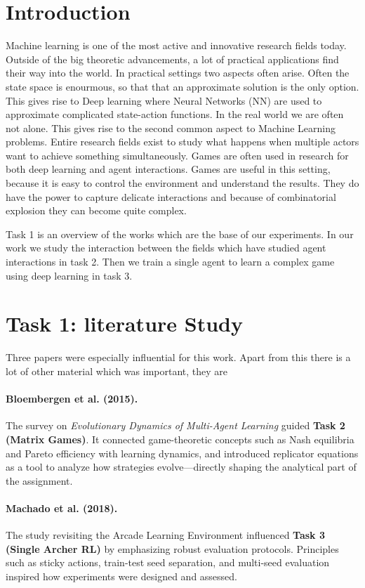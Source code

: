 \section{Introduction}
Machine learning is one of the most active and innovative research fields today. Outside of the big theoretic advancements, a lot of practical applications find their way into the world. In practical settings two aspects often arise. Often the state space is enourmous, so that that an approximate solution is the only option. This gives rise to Deep learning where Neural Networks (NN) are used to approximate complicated state-action functions. In the real world we are often not alone. This gives rise to the second common aspect to Machine Learning problems. Entire research fields exist to study what happens when multiple actors want to achieve something simultaneously. Games are often used in research for both deep learning and agent interactions. Games are useful in this setting, because it is easy to control the environment and understand the results. They do have the power to capture delicate interactions and because of combinatorial explosion they can become quite complex. 

Task 1 is an overview of the works which are the base of our experiments. In our work we study the interaction between the fields which have studied agent interactions in task 2. Then we train a single agent to learn a complex game using deep learning in task 3. 


\section{Task 1: literature Study}

Three papers were especially influential for this work. Apart from this there is a lot of other material which was important, they are 

\paragraph{Bloembergen et al. (2015).}  
The survey on \emph{Evolutionary Dynamics of Multi-Agent Learning}
\cite{bloembergen2015evolutionary} guided \textbf{Task 2 (Matrix Games)}. It
connected game-theoretic concepts such as Nash equilibria and Pareto
efficiency with learning dynamics, and introduced replicator equations as a
tool to analyze how strategies evolve—directly shaping the analytical part of
the assignment.

\paragraph{Machado et al. (2018).}  
The study revisiting the Arcade Learning Environment \cite{machado2018revisiting}
influenced \textbf{Task 3 (Single Archer RL)} by emphasizing robust evaluation
protocols. Principles such as sticky actions, train-test seed separation, and
multi-seed evaluation inspired how experiments were designed and assessed.

